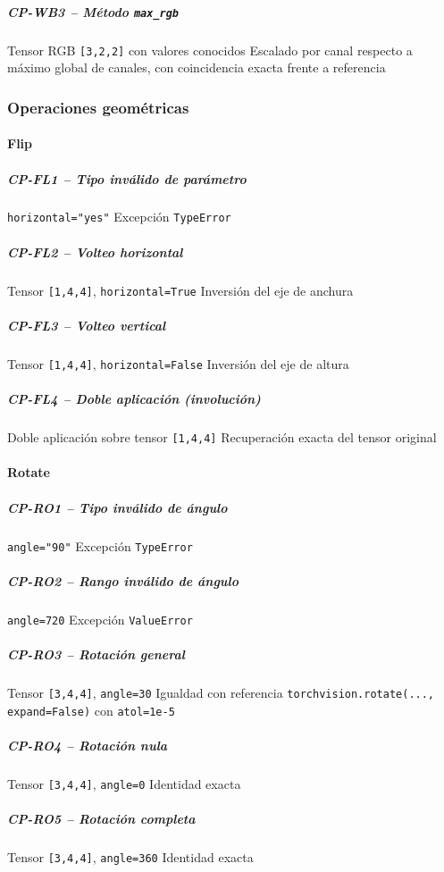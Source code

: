 \subparagraph{CP-WB3 -- Método \texttt{max\_rgb}}\label{cp:CP-WB3}
\testcasetable
{Tensor RGB \texttt{[3,2,2]} con valores conocidos}
{Escalado por canal respecto a máximo global de canales, con coincidencia exacta frente a referencia}

\subsubsection{Operaciones geométricas} \label{subsubsec:8_2_4_geometry}

\paragraph{Flip}
\subparagraph{CP-FL1 -- Tipo inválido de parámetro}\label{cp:CP-FL1}
\testcasetable
{\texttt{horizontal="yes"}}
{Excepción \texttt{TypeError}}

\subparagraph{CP-FL2 -- Volteo horizontal}\label{cp:CP-FL2}
\testcasetable
{Tensor \texttt{[1,4,4]}, \texttt{horizontal=True}}
{Inversión del eje de anchura}

\subparagraph{CP-FL3 -- Volteo vertical}\label{cp:CP-FL3}
\testcasetable
{Tensor \texttt{[1,4,4]}, \texttt{horizontal=False}}
{Inversión del eje de altura}

\subparagraph{CP-FL4 -- Doble aplicación (involución)}\label{cp:CP-FL4}
\testcasetable
{Doble aplicación sobre tensor \texttt{[1,4,4]}}
{Recuperación exacta del tensor original}

\paragraph{Rotate}
\subparagraph{CP-RO1 -- Tipo inválido de ángulo}\label{cp:CP-RO1}
\testcasetable
{\texttt{angle="90"}}
{Excepción \texttt{TypeError}}

\subparagraph{CP-RO2 -- Rango inválido de ángulo}\label{cp:CP-RO2}
\testcasetable
{\texttt{angle=720}}
{Excepción \texttt{ValueError}}

\subparagraph{CP-RO3 -- Rotación general}\label{cp:CP-RO3}
\testcasetable
{Tensor \texttt{[3,4,4]}, \texttt{angle=30}}
{Igualdad con referencia \texttt{torchvision.rotate(..., expand=False)} con \texttt{atol=1e-5}}

\subparagraph{CP-RO4 -- Rotación nula}\label{cp:CP-RO4}
\testcasetable
{Tensor \texttt{[3,4,4]}, \texttt{angle=0}}
{Identidad exacta}

\subparagraph{CP-RO5 -- Rotación completa}\label{cp:CP-RO5}
\testcasetable
{Tensor \texttt{[3,4,4]}, \texttt{angle=360}}
{Identidad exacta}

